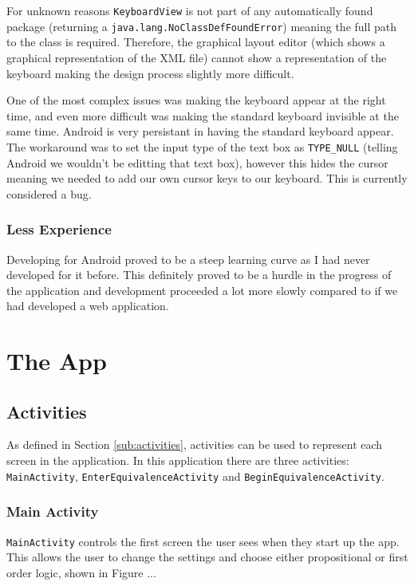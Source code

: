 \documentclass{report}
\begin{document}
For unknown reasons {\tt KeyboardView} is not part of any automatically found package (returning a {\tt java.lang.NoClassDefFoundError}) meaning the full path to the class is required. Therefore, the graphical layout editor (which shows a graphical representation of the XML file) cannot show a representation of the keyboard making the design process slightly more difficult.

One of the most complex issues was making the keyboard appear at the right time, and even more difficult was making the standard keyboard invisible at the same time. Android is very persistant in having the standard keyboard appear. The workaround was to set the input type of the text box as {\tt TYPE\_NULL} (telling Android we wouldn't be editting that text box), however this hides the cursor meaning we needed to add our own cursor keys to our keyboard. This is currently considered a bug.

\subsection{Less Experience}

Developing for Android proved to be a steep learning curve as I had never developed for it before. This definitely proved to be a hurdle in the progress of the application and development proceeded a lot more slowly compared to if we had developed a web application.

\chapter{The App}
\label{chap:the_app}

\section{Activities}

As defined in Section \ref{sub:activities}, activities can be used to represent each screen in the application. In this application there are three activities: {\tt MainActivity}, {\tt EnterEquivalenceActivity} and {\tt BeginEquivalenceActivity}.

\subsection{Main Activity}

{\tt MainActivity} controls the first screen the user sees when they start up the app. This allows the user to change the settings and choose either propositional or first order logic, shown in Figure ...
\end{document}
